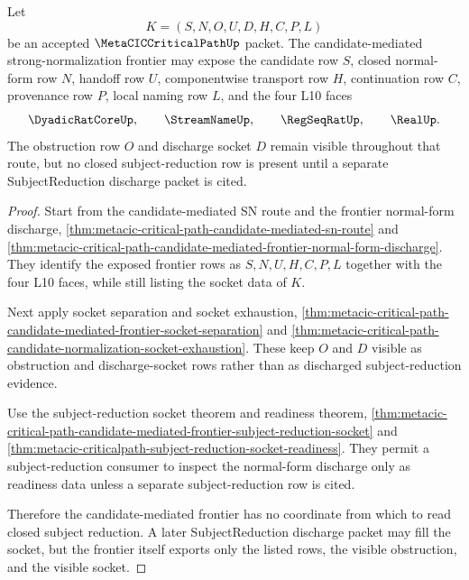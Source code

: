 \begin{theorem}
\label{thm:metacic-critical-path-candidate-mediated-frontier-subject-reduction-row-absence}
Let
$$
K=(S,N,O,U,D,H,C,P,L)
$$
be an accepted $\MetaCICCriticalPathUp$ packet. The candidate-mediated strong-normalization frontier may expose the candidate row $S$, closed normal-form row $N$, handoff row $U$, componentwise transport row $H$, continuation row $C$, provenance row $P$, local naming row $L$, and the four L10 faces
$$
\DyadicRatCoreUp,\qquad
\StreamNameUp,\qquad
\RegSeqRatUp,\qquad
\RealUp .
$$
The obstruction row $O$ and discharge socket $D$ remain visible throughout that route, but no closed subject-reduction row is present until a separate SubjectReduction discharge packet is cited.
\end{theorem}
\begin{proof}
Start from the candidate-mediated SN route and the frontier normal-form discharge, \autoref{thm:metacic-critical-path-candidate-mediated-sn-route} and \autoref{thm:metacic-critical-path-candidate-mediated-frontier-normal-form-discharge}. They identify the exposed frontier rows as $S,N,U,H,C,P,L$ together with the four L10 faces, while still listing the socket data of $K$.

Next apply socket separation and socket exhaustion, \autoref{thm:metacic-critical-path-candidate-mediated-frontier-socket-separation} and \autoref{thm:metacic-critical-path-candidate-normalization-socket-exhaustion}. These keep $O$ and $D$ visible as obstruction and discharge-socket rows rather than as discharged subject-reduction evidence.

Use the subject-reduction socket theorem and readiness theorem, \autoref{thm:metacic-critical-path-candidate-mediated-frontier-subject-reduction-socket} and \autoref{thm:metacic-criticalpath-subject-reduction-socket-readiness}. They permit a subject-reduction consumer to inspect the normal-form discharge only as readiness data unless a separate subject-reduction row is cited.

Therefore the candidate-mediated frontier has no coordinate from which to read closed subject reduction. A later SubjectReduction discharge packet may fill the socket, but the frontier itself exports only the listed rows, the visible obstruction, and the visible socket.
\end{proof}
